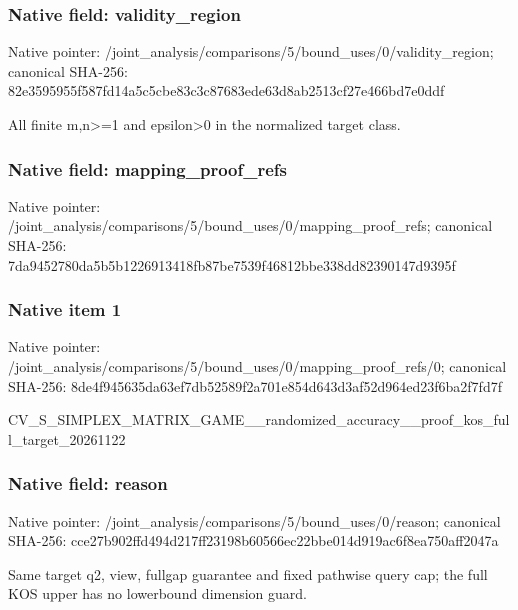 \documentclass[10pt,a4paper]{article}
\begin{document}
\subsubsection{Native field: validity\_region}


Native pointer: /joint\_analysis/comparis\allowbreak{}ons/5/bound\_uses/0/valid\allowbreak{}ity\_region; canonical SHA-256: 82e3595955f587fd14a5c5cb\allowbreak{}e83c3c87683ede63d8ab2513\allowbreak{}cf27e466bd7e0ddf


All finite m,n>=1 and epsilon>0 in the normalized target class.


\subsubsection{Native field: mapping\_proof\_refs}


Native pointer: /joint\_analysis/comparis\allowbreak{}ons/5/bound\_uses/0/mappi\allowbreak{}ng\_proof\_refs; canonical SHA-256: 7da9452780da5b5b12269134\allowbreak{}18fb87be7539f46812bbe338\allowbreak{}dd82390147d9395f



\subsubsection{Native item 1}


Native pointer: /joint\_analysis/comparis\allowbreak{}ons/5/bound\_uses/0/mappi\allowbreak{}ng\_proof\_refs/0; canonical SHA-256: 8de4f945635da63ef7db5258\allowbreak{}9f2a701e854d643d3af52d96\allowbreak{}4ed23f6ba2f7fd7f


CV\_S\_SIMPLEX\_MATRIX\_GAME\allowbreak{}\_\_randomized\_accuracy\_\_p\allowbreak{}roof\_kos\_full\_target\_202\allowbreak{}61122


\subsubsection{Native field: reason}


Native pointer: /joint\_analysis/comparis\allowbreak{}ons/5/bound\_uses/0/reaso\allowbreak{}n; canonical SHA-256: cce27b902ffd494d217ff231\allowbreak{}98b60566ec22bbe014d919ac\allowbreak{}6f8ea750aff2047a


Same target q2, view, fullgap guarantee and fixed pathwise query cap; the full KOS upper has no lowerbound dimension guard.
\end{document}
